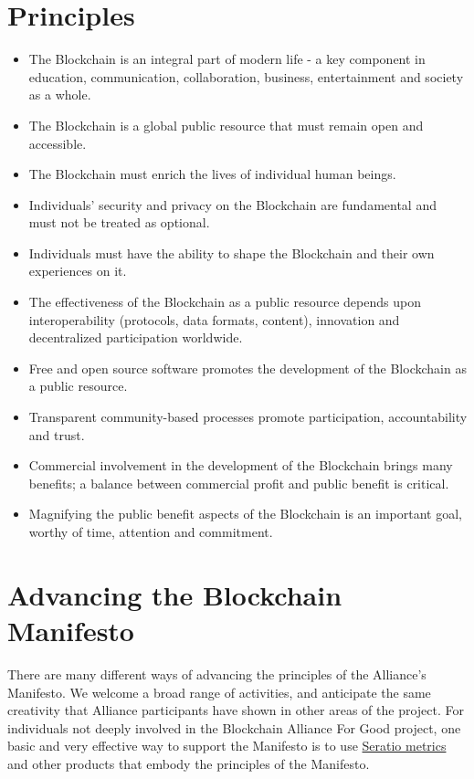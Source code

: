 \documentclass[twoside,twocolumn]{article}
\begin{document}
\section{Principles}
\begin{itemize}
  \item The Blockchain is an integral part of modern life - a key component in
  education, communication, collaboration, business, entertainment and society
  as a whole.
  \item The Blockchain is a global public resource that must remain open and
  accessible.
  \item The Blockchain must enrich the lives of individual human beings.
  \item Individuals’ security and privacy on the Blockchain are fundamental and
must not be treated as optional.
  \item Individuals must have the ability to shape the Blockchain and their own
experiences on it.
  \item The effectiveness of the Blockchain as a public resource depends upon
interoperability (protocols, data formats, content), innovation and
decentralized participation worldwide.
  \item Free and open source software promotes the development of the Blockchain
as a public resource.
  \item Transparent community-based processes promote participation,
  accountability and trust.
  \item Commercial involvement in the development of the Blockchain brings many
 benefits; a balance between commercial profit and public benefit is critical.
  \item Magnifying the public benefit aspects of the Blockchain is an important
   goal, worthy of time, attention and commitment.
\end{itemize}

\section{Advancing the Blockchain Manifesto}
There are many different ways of advancing the principles of the Alliance's
Manifesto. We welcome a broad range of activities, and anticipate the same
creativity that Alliance participants have shown in other areas of the project.
For individuals not deeply involved in the Blockchain Alliance For Good project,
one basic and very effective way to support the Manifesto is to use
\href{http://seratio.com}{Seratio metrics} and other products that embody the
principles of the Manifesto.
\end{document}
